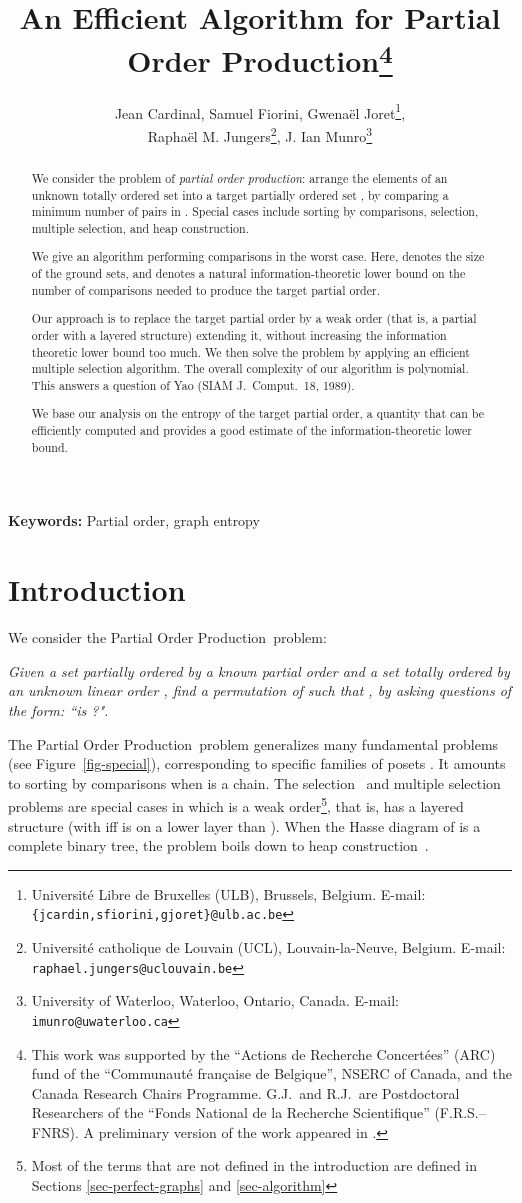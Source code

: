 \documentclass[12pt,oneside]{article}
\author{Jean Cardinal, Samuel Fiorini, Gwena\"el Joret\thanks{Universit\'e Libre de Bruxelles (ULB), Brussels, Belgium. {E-mail: \tt\small \{jcardin,sfiorini,gjoret\}@ulb.ac.be}
},\\ Rapha\"el M. Jungers\thanks{Universit\'e catholique de Louvain (UCL), Louvain-la-Neuve, Belgium. {E-mail: \tt\small raphael.jungers@uclouvain.be}  }, J. Ian Munro\thanks{University of Waterloo, Waterloo, Ontario, Canada. {E-mail: \tt\small imunro@uwaterloo.ca}}
}
\title{An Efficient Algorithm for Partial Order Production\footnote{This work was supported by the ``Actions de Recherche Concert\'ees'' (ARC) fund of the ``Communaut\'e fran\c{c}aise de Belgique'', NSERC of Canada, and the Canada Research Chairs Programme. G.J.\ and R.J.\ are Postdoctoral Researchers of the ``Fonds National de la Recherche Scientifique'' (F.R.S.--FNRS). A preliminary version of the work appeared in \cite{CFJJM09-stoc}.}}
\date{}
\newcommand{\partsort}{{\sc Partial Order Production}}
\begin{document}
\maketitle

\begin{abstract} We consider the problem of {\em partial order production}: arrange the elements of an unknown totally ordered set  into a target partially ordered set , by comparing a minimum number of pairs in . Special cases include sorting by comparisons, selection, multiple selection, and heap construction.

We give an algorithm performing  comparisons in the worst case. Here,  denotes the size of the ground sets, and  denotes a natural information-theoretic lower bound on the number of comparisons needed to produce the target partial order.

Our approach is to replace the target partial order by a weak order (that is, a partial order with a layered structure) extending it, without increasing the information theoretic lower bound too much. We then solve the problem by applying an efficient multiple selection algorithm. The overall complexity of our algorithm is polynomial. This answers a question of Yao (SIAM J.\ Comput.\ 18, 1989).

We base our analysis on the entropy of the target partial order, a quantity that can be efficiently computed and provides a good estimate of the information-theoretic lower bound.
\end{abstract}
\textbf{Keywords: }{Partial order, graph entropy}

\section{Introduction}

We consider the \partsort\ problem:\smallskip

{\it Given a set  partially ordered by a known partial order  and a set  totally ordered by an unknown linear order , find a permutation  of  such that , by asking questions of the form: ``is ?".}\smallskip

The \partsort\ problem generalizes many fundamental problems (see Figure~\ref{fig-special}), corresponding to specific families of posets . It amounts to sorting by comparisons when  is a chain. The selection~\cite{H61} and multiple selection~\cite{C71} problems are special cases in which  is a weak order\footnote{Most of the terms that are not defined in the introduction are defined in Sections \ref{sec-perfect-graphs} and \ref{sec-algorithm}}, that is, has a layered structure (with  iff  is on a lower layer than ). When the Hasse diagram of  is a complete binary tree, the problem boils down to heap construction~\cite{CC92}.
\end{document}
